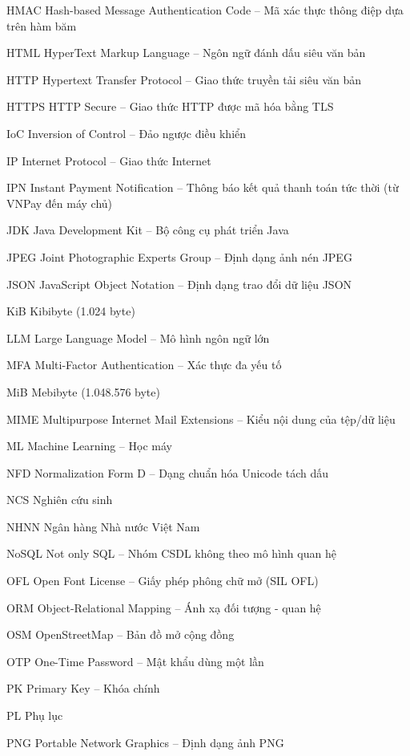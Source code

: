 \begin{abbrv}
	\item[HMAC] Hash-based Message Authentication Code -- Mã xác thực thông điệp dựa trên hàm băm
	\item[HTML] HyperText Markup Language -- Ngôn ngữ đánh dấu siêu văn bản
	\item[HTTP] Hypertext Transfer Protocol -- Giao thức truyền tải siêu văn bản
	\item[HTTPS] HTTP Secure -- Giao thức HTTP được mã hóa bằng TLS
	\item[IoC] Inversion of Control -- Đảo ngược điều khiển
	\item[IP] Internet Protocol -- Giao thức Internet
	\item[IPN] Instant Payment Notification -- Thông báo kết quả thanh toán tức thời (từ VNPay đến máy chủ)
	\item[JDK] Java Development Kit -- Bộ công cụ phát triển Java
	\item[JPEG] Joint Photographic Experts Group -- Định dạng ảnh nén JPEG
	\item[JSON] JavaScript Object Notation -- Định dạng trao đổi dữ liệu JSON
	\item[KiB] Kibibyte (1.024 byte)
	\item[LLM] Large Language Model -- Mô hình ngôn ngữ lớn
	\item[MFA] Multi-Factor Authentication -- Xác thực đa yếu tố
	\item[MiB] Mebibyte (1.048.576 byte)
	\item[MIME] Multipurpose Internet Mail Extensions -- Kiểu nội dung của tệp/dữ liệu
	\item[ML] Machine Learning -- Học máy
	\item[NFD] Normalization Form D -- Dạng chuẩn hóa Unicode tách dấu
	\item[NCS] Nghiên cứu sinh
	\item[NHNN] Ngân hàng Nhà nước Việt Nam
	\item[NoSQL] Not only SQL -- Nhóm CSDL không theo mô hình quan hệ
	\item[OFL] Open Font License -- Giấy phép phông chữ mở (SIL OFL)
	\item[ORM] Object-Relational Mapping -- Ánh xạ đối tượng - quan hệ
	\item[OSM] OpenStreetMap -- Bản đồ mở cộng đồng
	\item[OTP] One-Time Password -- Mật khẩu dùng một lần
	\item[PK] Primary Key -- Khóa chính
	\item[PL] Phụ lục
	\item[PNG] Portable Network Graphics -- Định dạng ảnh PNG

\end{abbrv}
